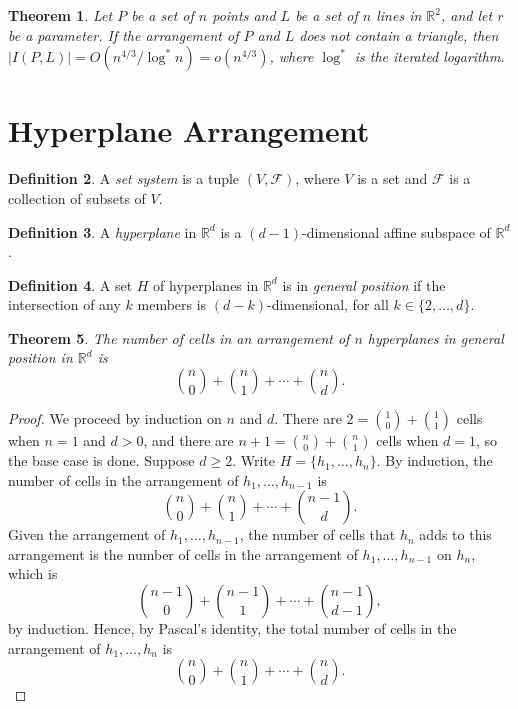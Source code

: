 \documentclass[12pt,reqno]{amsart}
\newtheorem{theorem}{Theorem}[section]
\theoremstyle{definition}
\newtheorem{definition}[theorem]{Definition}
\theoremstyle{remark}
\renewcommand{\geq}{\geqslant}
\def\F{\mathcal{F}}
\def\R{\mathbb{R}}
\numberwithin{equation}{section}
\begin{document}
\begin{theorem}
	Let $P$ be a set of $n$ points and $L$ be a set of $n$ lines in $\R^2$, and let $r$ be a parameter. If the arrangement of $P$ and $L$ does not contain a triangle, then $|I(P, L)| = O(n^{4/3}/\log^* n) = o(n^{4/3})$, where $\log^*$ is the iterated logarithm. 
\end{theorem}

\newpage

\section{Hyperplane Arrangement}

\begin{definition}
	A \textit{set system} is a tuple $(V, \F)$, where $V$ is a set and $\F$ is a collection of subsets of $V$. 
\end{definition}

\begin{definition}
	A \textit{hyperplane} in $\R^d$ is a $(d - 1)$-dimensional affine subspace of $\R^d$. 
\end{definition}

\begin{definition}
	A set $H$ of hyperplanes in $\R^d$ is in \textit{general position} if the intersection of any $k$ members is $(d - k)$-dimensional, for all $k \in \{2, \ldots, d\}$.
\end{definition}

\begin{theorem}
	The number of cells in an arrangement of $n$ hyperplanes in general position in $\R^d$ is
	\[
		\binom{n}{0} + \binom{n}{1} + \cdots + \binom{n}{d}.
	\]
\end{theorem}

\begin{proof}
	We proceed by induction on $n$ and $d$. There are $2 = \binom{1}{0} + \binom{1}{1}$ cells when $n = 1$ and $d > 0$, and there are $n + 1 = \binom{n}{0} + \binom{n}{1}$ cells when $d = 1$, so the base case is done. Suppose $d \geq 2$. Write $H = \{h_1, \ldots, h_n\}$. By induction, the number of cells in the arrangement of $h_1, \ldots, h_{n - 1}$ is 
	\[
		\binom{n}{0} + \binom{n}{1} + \cdots + \binom{n - 1}{d}.
	\]
	Given the arrangement of $h_1, \ldots, h_{n - 1}$, the number of cells that $h_n$ adds to this arrangement is the number of cells in the arrangement of $h_1, \ldots, h_{n - 1}$ on $h_n$, which is
	\[
		\binom{n - 1}{0} + \binom{n - 1}{1} + \cdots + \binom{n - 1}{d - 1},
	\]
	by induction. Hence, by Pascal's identity, the total number of cells in the arrangement of $h_1, \ldots, h_n$ is
	\[
		\binom{n}{0} + \binom{n}{1} + \cdots + \binom{n}{d}.
	\]
\end{proof}
\end{document}
